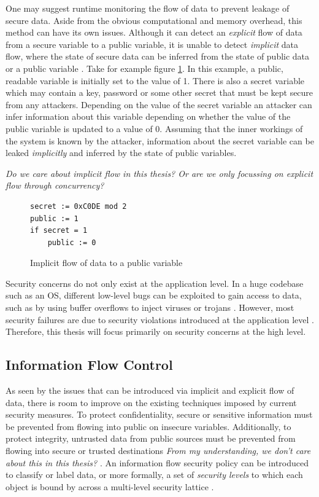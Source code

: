 \documentclass[twocolumn]{article}
\begin{document}
One may suggest runtime monitoring the flow of data to prevent leakage of secure data. Aside from the obvious computational and memory overhead, this method can have its own issues. Although it can detect an \textit{explicit} flow of data from a secure variable to a public variable, it is unable to detect \textit{implicit} data flow, where the state of secure data can be inferred from the state of public data or a public variable \cite{denning1977certification}. Take for example figure \ref{fig:implicit}. In this example, a public, readable variable is initially set to the value of 1. There is also a secret variable which may contain a key, password or some other secret that must be kept secure from any attackers. Depending on the value of the secret variable an attacker can infer information about this variable depending on whether the value of the public variable is updated to a value of 0. Assuming that the inner workings of the system is known by the attacker, information about the secret variable can be leaked \textit{implicitly} and inferred by the state of public variables.

\textit{Do we care about implicit flow in this thesis? Or are we only focussing on explicit flow through concurrency?}


\begin{figure}
    \begin{lstlisting}
secret := 0xC0DE mod 2
public := 1
if secret = 1
    public := 0
        \end{lstlisting}
    \caption{Implicit flow of data to a public variable}
    \label{fig:implicit}
\end{figure}

Security concerns do not only exist at the application level. In a huge codebase such as an OS, different low-level bugs can be exploited to gain access to data, such as by using buffer overflows to inject viruses or trojans \cite{agten2012recent}. However, most security failures are due to security violations introduced at the application level \cite{jang2010empirical}. Therefore, this thesis will focus primarily on security concerns at the high level.

\subsection{Information Flow Control}
As seen by the issues that can be introduced via implicit and explicit flow of data, there is room to improve on the existing techniques imposed by current security measures. To protect confidentiality, secure or sensitive information must be prevented from flowing into public on insecure variables. Additionally, to protect integrity, untrusted data from public sources must be prevented from flowing into secure or trusted destinations \textit{From my understanding, we don't care about this in this thesis?} \cite{balliu2014logics}. An information flow security policy can be introduced to classify or label data, or more formally, a set of \textit{security levels} to which each object is bound by across a multi-level security lattice \cite{denning1976lattice}.
\end{document}

